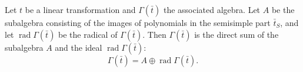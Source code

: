 Let $t$ be a linear transformation and $\Gamma(\bar{t})$ the associated algebra. Let $A$ be the subalgebra consisting of the images of polynomials in the semisimple part $\bar{t}_S$, and let $\operatorname{rad} \Gamma(\bar{t})$ be the radical of $\Gamma(\bar{t})$. Then $\Gamma(\bar{t})$ is the direct sum of the subalgebra $A$ and the ideal $\operatorname{rad} \Gamma(\bar{t})$:
$$
\Gamma(\bar{t}) = A \oplus \operatorname{rad} \Gamma(\bar{t}).
$$

